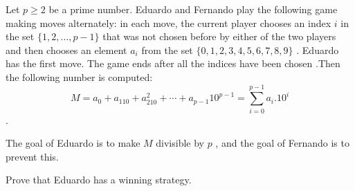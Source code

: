 Let 
$ p \geq 2$
 be a prime number. Eduardo and Fernando play the following game making moves alternately: in each move, the current player chooses an index 
$i$
 in the set 
$\{1,2,\ldots, p-1 \}$
 that was not chosen before by either of the two players and then chooses an element 
$a_i$
 from the set 
$\{0,1,2,3,4,5,6,7,8,9\}$
.
 Eduardo has the first move. The game ends after all the indices have been chosen .Then the following number is computed:
$$M=a_0+a_110+a_210^2+\cdots+a_{p-1}10^{p-1}= \sum_{i=0}^{p-1}a_i.10^i$$
.


The goal of Eduardo is to make  
$M$
 divisible by 
$p$
,
 and the goal of Fernando is to prevent this.


Prove that Eduardo has a winning strategy.
